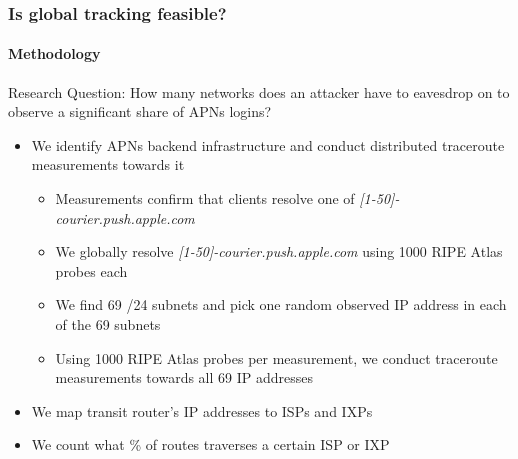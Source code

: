 \begin{frame}
	\frametitle{Is global tracking feasible?}
	\framesubtitle{Methodology}
	Research Question: How many networks does an attacker have to eavesdrop on to observe a significant share of APNs logins?
	\begin{itemize}
		\item We identify APNs backend infrastructure and conduct distributed traceroute \\ measurements towards it
		\begin{itemize}
		\item Measurements confirm that clients resolve one of \textit{[1-50]-courier.push.apple.com}
		\item We globally resolve \textit{[1-50]-courier.push.apple.com} using 1000 RIPE Atlas probes each
		\item We find 69 /24 subnets and pick one random observed IP address in each of the 69 subnets
		\item Using 1000 RIPE Atlas probes per measurement, we conduct traceroute measurements towards all 69 IP addresses
		\end{itemize}
		\item We map transit router's IP addresses to ISPs and IXPs 
		\item We count what \% of routes traverses a certain ISP or IXP
	\end{itemize}	
\end{frame}

